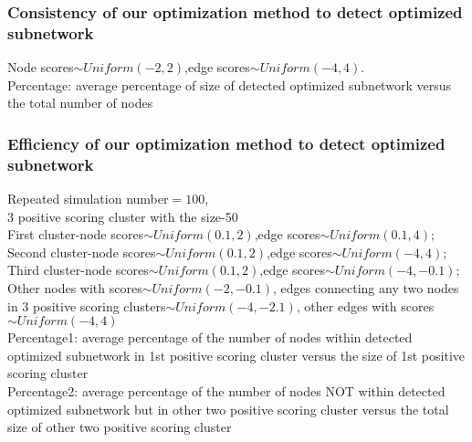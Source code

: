 \documentclass[10pt]{beamer}
\begin{document}
	
\begingroup
\small 
\begin{frame}[fragile]
	\frametitle{Consistency of our optimization method to detect optimized subnetwork}
Node scores$\sim Uniform(-2,2)$,edge scores$\sim Uniform(-4,4)$.\\
	Percentage: average percentage of size of detected optimized subnetwork versus the total number of nodes 
	\begin{table}[!ht]
		\centering
		\end{table}
\end{frame}
\endgroup




\begingroup
\small 
\begin{frame}[fragile]
	\frametitle{Efficiency of our optimization method to detect optimized subnetwork}
	Repeated simulation number$=100$, \\
	3 positive scoring cluster with the size-50 \\
	 First cluster-node scores$\sim Uniform(0.1,2)$,edge scores$\sim Uniform(0.1,4)$;\\
	 Second cluster-node scores$\sim Uniform(0.1,2)$,edge scores$\sim Uniform(-4,4)$;\\
	Third cluster-node scores$\sim Uniform(0.1,2)$,edge scores$\sim Uniform(-4,-0.1)$; \\
	Other nodes with scores$\sim Uniform(-2,-0.1)$, edges connecting any two nodes in 3 positive scoring clusters$\sim Uniform(-4,-2.1)$, other edges with scores$\sim Uniform(-4,4)$ 
	\\
Percentage1: average percentage of the number of nodes within detected optimized subnetwork in 1st positive scoring cluster versus the size of 1st positive scoring cluster\\
Percentage2: average percentage of the number of nodes NOT within detected optimized subnetwork but in other two positive scoring cluster versus the total size of other two positive scoring cluster 
\end{frame}
\endgroup
\end{document}
